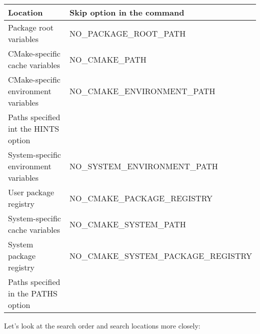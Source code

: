 \begin{table}[H]
	\centering
	\begin{tabular}{|l|l|}
		\hline
		\textbf{Location}                     & \textbf{Skip option in the command}  \\ \hline
		Package root variables                & NO\_PACKAGE\_ROOT\_PATH              \\ \hline
		CMake-specific cache variables        & NO\_CMAKE\_PATH                      \\ \hline
		CMake-specific environment variables  & NO\_CMAKE\_ENVIRONMENT\_PATH         \\ \hline
		Paths specified int the HINTS option  &                                      \\ \hline
		System-specific environment variables & NO\_SYSTEM\_ENVIRONMENT\_PATH        \\ \hline
		User package registry                 & NO\_CMAKE\_PACKAGE\_REGISTRY         \\ \hline
		System-specific cache variables       & NO\_CMAKE\_SYSTEM\_PATH              \\ \hline
		System package registry               & NO\_CMAKE\_SYSTEM\_PACKAGE\_REGISTRY \\ \hline
		Paths specified in the PATHS option   &                                      \\ \hline
	\end{tabular}
\end{table}

Let's look at the search order and search locations more closely:

